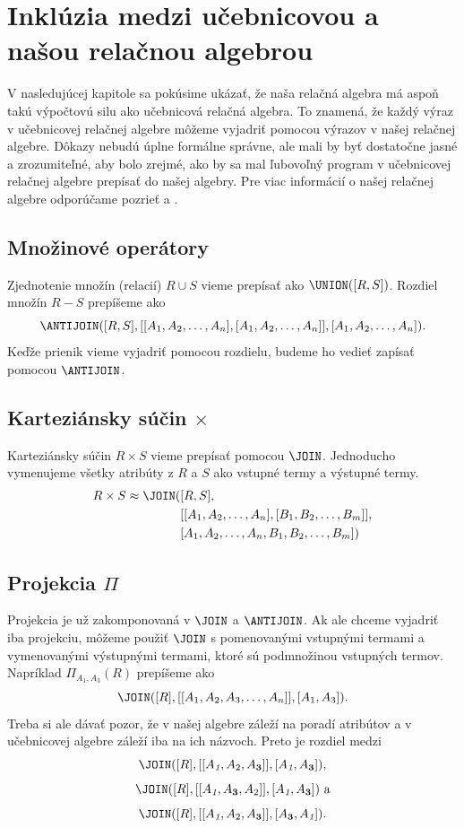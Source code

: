 \section{Inklúzia medzi učebnicovou a našou relačnou algebrou}

V nasledujúcej kapitole sa pokúsime ukázať, že naša relačná algebra má aspoň takú výpočtovú silu ako
učebnicová relačná algebra. To znamená, že každý výraz v učebnicovej relačnej algebre môžeme
vyjadriť pomocou výrazov v našej relačnej algebre. Dôkazy nebudú úplne formálne správne, ale mali by
byť dostatočne jasné a zrozumiteľné, aby bolo zrejmé, ako by sa mal ľubovoľný program v učebnicovej
relačnej algebre prepísať do našej algebry. Pre viac informácií o našej relačnej algebre odporúčame
pozrieť \cite{RAcompilator} a \cite{JAVAimple}.

\subsection*{Množinové operátory}
Zjednotenie množín (relacií) $R \cup S$ vieme prepísať ako $\UNION([R, S])$. Rozdiel množín $R - S$
prepíšeme ako $$\ANTIJOIN([R, S], [[A_1, A_2, \dots, A_n], [A_1, A_2, \dots, A_n]], [A_1, A_2,
\dots, A_n])\text{.}$$ Keďže prienik vieme vyjadriť pomocou rozdielu, budeme ho vedieť zapísať
pomocou $\ANTIJOIN$.

\subsection*{Karteziánsky súčin $\times$}
Karteziánsky súčin $R \times S$ vieme prepísať pomocou $\JOIN$. Jednoducho vymenujeme všetky
atribúty z $R$ a $S$ ako vstupné termy a výstupné termy. 
\begin{align*}
    R \times S \approx \JOIN(&[R, S],\\ 
                             &[[A_1, A_2, \dots, A_n], [B_1, B_2, \dots, B_m]],\\ 
                             &[A_1, A_2, \dots, A_n, B_1, B_2, \dots, B_m])
\end{align*}

\subsection*{Projekcia $\Pi$}
Projekcia je už zakomponovaná v $\JOIN$ a $\ANTIJOIN$. Ak ale chceme vyjadriť iba projekciu, môžeme
použiť $\JOIN$ s pomenovanými vstupnými termami a vymenovanými výstupnými termami, ktoré sú
podmnožinou vstupných termov. Napríklad $\Pi_{A_1, A_3}(R)$ prepíšeme ako $$\JOIN([R], [[A_1, A_2,
A_3, \dots, A_n]], [A_1, A_3])\text{.}$$ Treba si ale dávať pozor, že v našej algebre záleží na
poradí atribútov a v učebnicovej algebre záleží iba na ich názvoch. Preto je rozdiel medzi 
$$\JOIN([R], [[A_\textit{1}, A_2, A_\textbf{3}]], [A_\textit{1}, A_\textbf{3}])\text{,}$$
$$\JOIN([R], [[A_\textit{1}, A_\textbf{3}, A_2]], [A_\textit{1}, A_\textbf{3}])\text{ a}$$
$$\JOIN([R], [[A_\textit{1}, A_2, A_\textbf{3}]], [A_\textbf{3}, A_\textit{1}])\text{.}$$

